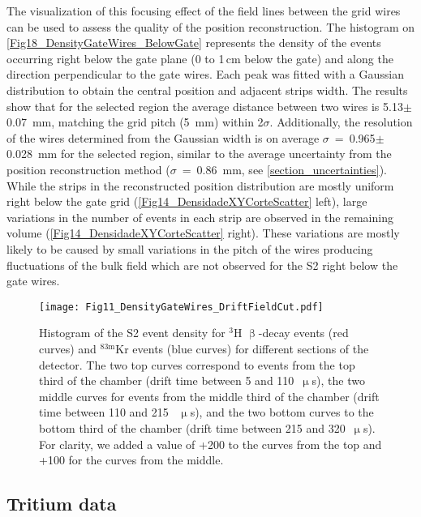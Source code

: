 \documentclass[a4paper,11pt]{article}
\begin{document}
The visualization of this focusing effect of the field lines between the grid wires can be used  to assess the quality of the position reconstruction. The histogram on \cref{Fig18_DensityGateWires_BelowGate} represents the density of the  events occurring right below the gate plane (0 to 1\,cm below the gate) and along the direction perpendicular to the gate wires. Each peak was fitted with a Gaussian distribution to obtain the central position and adjacent strips width. The results show that for the selected region the average distance between two wires is 5.13$\pm$0.07~mm, matching the grid pitch (5~mm) within 2$\sigma$. Additionally, the resolution of the wires determined from the Gaussian width is on average  $\sigma$~=~0.965$\pm$0.028~mm  for the selected region, similar to the average uncertainty from the position reconstruction method ($\sigma$~=~0.86~mm, see \cref{section_uncertainties}). While the strips in the reconstructed position distribution are mostly  uniform right below the gate grid (\cref{Fig14_DensidadeXYCorteScatter} left), large variations in the number of events in each strip are observed in the remaining volume (\cref{Fig14_DensidadeXYCorteScatter} right). These variations are mostly likely to be caused by small variations in the pitch of the wires producing fluctuations of the bulk field which are not observed for the S2 right below the gate wires.  

\begin{figure*}
 \begin{center}
\texttt{[image: Fig11\_DensityGateWires\_DriftFieldCut.pdf]}	
\caption{Histogram of the S2 event density for ${}^{3}$H $\upbeta$-decay events (red curves) and ${}^{\mathrm{83m}}$Kr events (blue curves) for different sections of the detector. The two top curves correspond to events from the top third of the chamber (drift time between 5 and 110~$\upmu$s), the two middle curves for events from the middle third of the chamber (drift time between 110 and 215~ $\upmu$s), and the two bottom curves to the bottom third of the chamber (drift time between 215 and 320~$\upmu$s). For clarity, we added a value of +200 to the curves from the top and +100 for the curves from the middle.}
\label{Fig18_DensityGateWires_DriftFieldCut}
\end{center}
\end{figure*}
  
\subsection{Tritium data}
\end{document}
